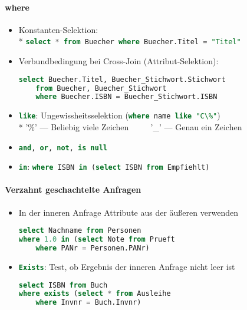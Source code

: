 \paragraph{where}
\begin{itemize}
	\item Konstanten-Selektion: \\*
	\lstinline[language=sql]{select * from Buecher where Buecher.Titel = "Titel"}
	\item Verbundbedingung bei Cross-Join (Attribut-Selektion):
	\begin{lstlisting}[language=sql]
select Buecher.Titel, Buecher_Stichwort.Stichwort
	from Buecher, Buecher_Stichwort
	where Buecher.ISBN = Buecher_Stichwort.ISBN
	\end{lstlisting}
	\item \lstinline[language=sql]{like}: Ungewissheitsselektion
	(\lstinline[language=sql]{where name like "C\%"})\\*
	'\%' --- Beliebig viele Zeichen $\qquad$ '\_' --- Genau ein Zeichen
	\item \lstinline[language=sql]{and, or, not, is null}
	\item \lstinline[language=sql]{in}: \lstinline[language=sql]{where ISBN in (select ISBN from Empfiehlt)}
\end{itemize}

\paragraph{Verzahnt geschachtelte Anfragen}
\begin{itemize}
	\item In der inneren Anfrage Attribute aus der äußeren verwenden
	\begin{lstlisting}[language=sql]
select Nachname from Personen
where 1.0 in (select Note from Prueft
	where PANr = Personen.PANr)
	\end{lstlisting}
	\item \lstinline[language=sql]{Exists}: Test, ob Ergebnis der inneren Anfrage nicht leer ist
	\begin{lstlisting}[language=sql]
select ISBN from Buch
where exists (select * from Ausleihe
	where Invnr = Buch.Invnr)
	\end{lstlisting}
\end{itemize}

